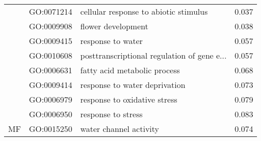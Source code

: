 \begin{longtable}{lllr}
   & GO:0071214 &        cellular response to abiotic stimulus &         0.037 \\
   & GO:0009908 &                           flower development &         0.038 \\
   & GO:0009415 &                            response to water &         0.057 \\
   & GO:0010608 &  posttranscriptional regulation of gene e... &         0.057 \\
   & GO:0006631 &                 fatty acid metabolic process &         0.068 \\
   & GO:0009414 &                response to water deprivation &         0.073 \\
   & GO:0006979 &                 response to oxidative stress &         0.079 \\
   & GO:0006950 &                           response to stress &         0.083 \\
\cline{1-4}
MF & GO:0015250 &                       water channel activity &         0.074 \\
\end{longtable}
